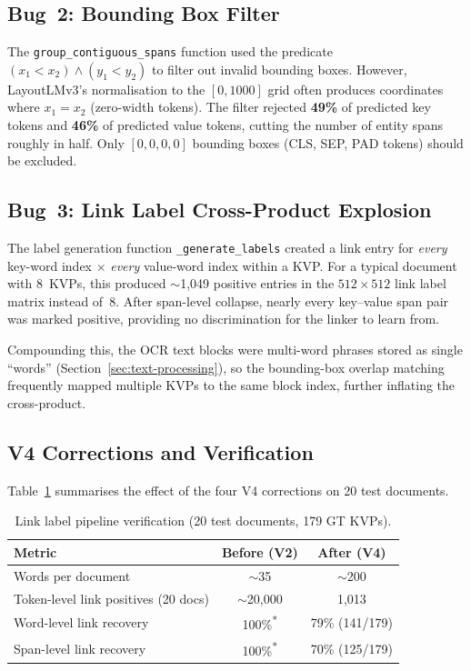 \subsection{Bug~2: Bounding Box Filter}

The \texttt{group\_contiguous\_spans} function used the predicate
$(x_1 < x_2) \wedge (y_1 < y_2)$ to filter out invalid bounding boxes.
However, LayoutLMv3's normalisation to the $[0, 1000]$ grid often produces
coordinates where $x_1 = x_2$ (zero-width tokens).  The filter rejected
\textbf{49\%} of predicted key tokens and \textbf{46\%} of predicted value
tokens, cutting the number of entity spans roughly in half.  Only
$[0,0,0,0]$ bounding boxes (CLS, SEP, PAD tokens) should be excluded.

\subsection{Bug~3: Link Label Cross-Product Explosion}

The label generation function \texttt{\_generate\_labels} created a link
entry for \emph{every} key-word index $\times$ \emph{every} value-word
index within a KVP.  For a typical document with 8~KVPs, this produced
$\sim$1{,}049 positive entries in the $512 \times 512$ link label matrix
instead of~8.  After span-level collapse, nearly every key--value span pair
was marked positive, providing no discrimination for the linker to learn
from.

Compounding this, the OCR text blocks were multi-word phrases stored as
single ``words'' (Section~\ref{sec:text-processing}), so the
bounding-box overlap matching frequently mapped multiple KVPs to the same
block index, further inflating the cross-product.

\subsection{V4 Corrections and Verification}

Table~\ref{tab:v4-verification} summarises the effect of the four V4
corrections on 20 test documents.

\begin{table}[ht]
  \centering
  \caption{Link label pipeline verification (20 test documents, 179 GT KVPs).}
  \label{tab:v4-verification}
  \begin{tabular}{@{}lcc@{}}
    \toprule
    \textbf{Metric} & \textbf{Before (V2)} & \textbf{After (V4)} \\
    \midrule
    Words per document & $\sim$35 & $\sim$200 \\
    Token-level link positives (20 docs) & $\sim$20{,}000 & 1{,}013 \\
    Word-level link recovery & 100\%\textsuperscript{*} & 79\% (141/179) \\
    Span-level link recovery & 100\%\textsuperscript{*} & 70\% (125/179) \\
    \bottomrule
  \end{tabular}
\end{table}

